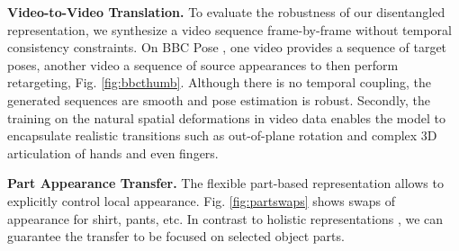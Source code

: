 	\textbf{Video-to-Video Translation.}
	To evaluate the robustness of our disentangled representation, we synthesize a video sequence frame-by-frame without temporal consistency constraints. On BBC Pose \cite{Charles:2013tb}, one video provides a sequence of target poses, another video a sequence of source appearances to then perform retargeting, Fig. \ref{fig:bbcthumb}.
	Although there is no temporal coupling, the generated sequences are smooth and pose estimation is robust. Secondly, the training on the natural spatial deformations in video data enables the model to encapsulate realistic transitions such as out-of-plane rotation and complex 3D articulation of hands and even fingers.


	\textbf{Part Appearance Transfer.}
	The flexible part-based representation allows to explicitly control local appearance. Fig. \ref{fig:partswaps} shows swaps of appearance for shirt, pants, etc. In contrast to holistic representations \cite{Esser:2018ue, Jakab:2018wc, Ma:2017uu, Ma:2017wq, deBem:2018wp}, we can guarantee the transfer to be focused on selected object parts.
	

